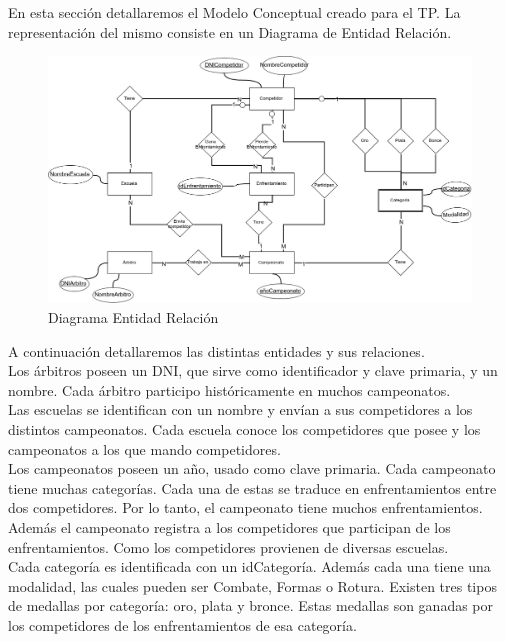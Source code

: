 En esta sección detallaremos el Modelo Conceptual creado para el TP. La representación del mismo consiste en un Diagrama
de Entidad Relación.

\begin{figure}[H]
  \centering
    \includegraphics[scale=0.4]{imagenes/DER.png}
  \caption{Diagrama Entidad Relación}
\end{figure}

A continuación detallaremos las distintas entidades y sus relaciones.\\

Los árbitros poseen un DNI, que sirve como identificador y clave primaria, y un nombre. Cada árbitro participo históricamente
en muchos campeonatos.\\

Las escuelas se identifican con un nombre y envían a sus competidores a los distintos campeonatos. Cada escuela conoce los competidores
que posee y los campeonatos a los que mando competidores.\\

Los campeonatos poseen un año, usado como clave primaria. Cada campeonato tiene muchas categorías. Cada una de estas se
traduce en enfrentamientos entre dos competidores. Por lo tanto, el campeonato tiene muchos enfrentamientos. Además
el campeonato registra a los competidores que participan de los enfrentamientos. Como los competidores provienen de
diversas escuelas.\\

Cada categoría es identificada con un idCategoría. Además cada una tiene una modalidad, las cuales pueden ser
Combate, Formas o Rotura. Existen tres tipos de medallas por categoría: oro, plata y bronce. Estas medallas son ganadas
por los competidores de los enfrentamientos de esa categoría.\\


